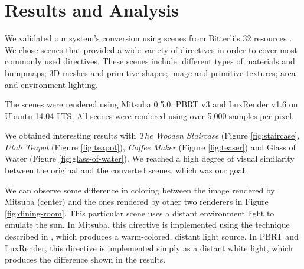 \section{Results and Analysis}
We validated our system's conversion using scenes from Bitterli's 32 resources 
\cite{resources16}. We chose scenes that provided a wide variety of directives 
in order to cover most commonly used directives. These scenes include: different 
types of materials and bumpmaps; 3D meshes and primitive shapes; image and 
primitive textures; area and environment lighting. 

The scenes were rendered using Mitsuba 0.5.0, PBRT v3 and LuxRender v1.6 on 
Ubuntu 14.04 LTS. All scenes were rendered using over 5,000 samples per pixel. 

We obtained interesting results with \textit{The Wooden Staircase} (Figure 
\ref{fig:staircase}, \textit{Utah Teapot} (Figure \ref{fig:teapot}), 
\textit{Coffee Maker} (Figure \ref{fig:teaser}) and Glass of Water (Figure 
\ref{fig:glass-of-water}). We reached a high degree of visual similarity between 
the original and the converted scenes, which was our goal.

We can observe some difference in coloring between the image rendered by Mitsuba 
(center) and the ones rendered by other two renderers in Figure 
\ref{fig:dining-room}. This particular scene uses a distant environment light to 
emulate the sun. In Mitsuba, this directive is implemented using the technique 
described in \cite{Preetham}, which produces a warm-colored, distant light source. In 
PBRT and LuxRender, this directive is implemented simply as a distant white 
light, which produces the difference shown in the results.

